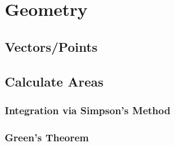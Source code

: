 \documentclass[../Notes/main.tex]{subfiles}
\begin{document}
\section{Geometry}
\subsection{Vectors/Points}

\subsection{Calculate Areas}
\subsubsection{Integration via Simpson's Method}

\subsubsection{Green's Theorem}

\end{document}
